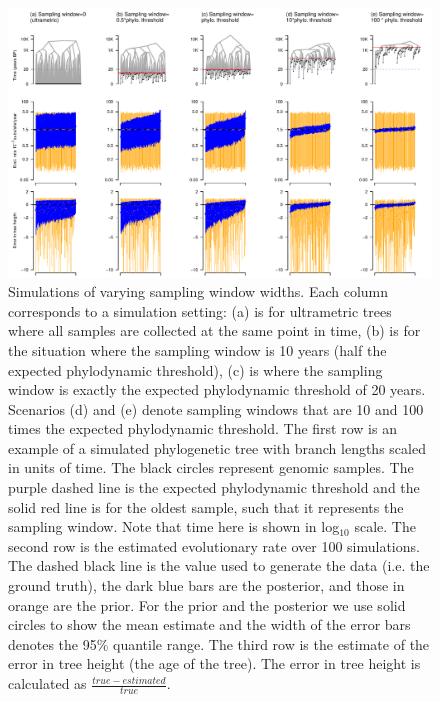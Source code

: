 \documentclass[11pt]{article}
\begin{document}
\begin{landscape}
	\begin{figure}[H]
		\begin{center}
		\includegraphics[scale=0.7, angle=0]{summary_all_estimates_correct_prior.pdf}
			\caption{Simulations of varying sampling window widths. Each column corresponds to a simulation setting: (a) is for ultrametric trees where all samples are collected at the same point in time, (b) is for the situation where the sampling window is 10 years (half the expected phylodynamic threshold), (c) is where the sampling window is exactly the expected phylodynamic threshold of 20 years. Scenarios (d) and (e) denote sampling windows that are 10 and 100 times the expected phylodynamic threshold. The first row is an example of a simulated phylogenetic tree with branch lengths scaled in units of time. The black circles represent genomic samples. The purple dashed line is the expected phylodynamic threshold and the solid red line is for the oldest sample, such that it represents the sampling window. Note that time here is shown in log$_{10}$ scale. The second row is the estimated evolutionary rate over 100 simulations. The dashed black line is the value used to generate the data (i.e. the ground truth), the dark blue bars are the posterior, and those in orange are the prior. For the prior and the posterior we use solid circles to show the mean estimate and the width of the error bars denotes the 95\% quantile range. The third row is the estimate of the error in tree height (the age of the tree). The error in tree height is calculated as $\frac{true-estimated}{true}$.}
			\label{figure:Fig2}
		\end{center}
	\end{figure}
\end{landscape}
\end{document}
